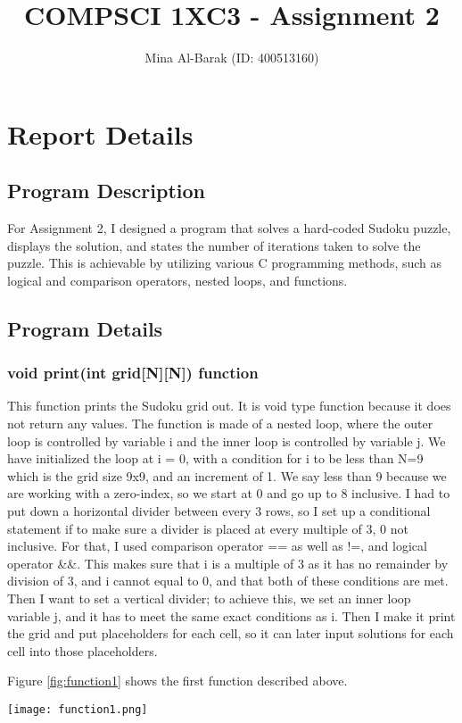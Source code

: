 \documentclass{report}
\title{COMPSCI 1XC3 - Assignment 2}
\author{Mina Al-Barak (ID: 400513160)}
\begin{document}
\maketitle

\chapter{Report Details}
\section{Program Description}
For Assignment 2, I designed a program that solves a hard-coded Sudoku puzzle, displays the solution, and states the number of iterations taken to solve the puzzle. This is achievable by utilizing various C programming methods, such as logical and comparison operators, nested loops, and functions.   

\section{Program Details}

\subsection{void print(int grid[N][N]) function}
This function prints the Sudoku grid out. It is void type function because it does not return any values. The function is made of a nested loop, where the outer loop is controlled by variable i and the inner loop is controlled by variable j. We have initialized the loop at i = 0, with a condition for i to be less than N=9 which is the grid size 9x9, and an increment of 1. We say less than 9 because we are working with a zero-index, so we start at 0 and go up to 8 inclusive. I had to put down a horizontal divider between every 3 rows, so I set up a conditional statement if to make sure a divider is placed at every multiple of 3, 0 not inclusive. For that, I used comparison operator == as well as !=, and logical operator \&\&. This makes sure that i is a multiple of 3 as it has no remainder by division of 3, and i cannot equal to 0, and that both of these conditions are met. Then I want to set a vertical divider; to achieve this, we set an inner loop variable j, and it has to meet the same exact conditions as i. Then I make it print the grid and put placeholders for each cell, so it can later input solutions for each cell into those placeholders.

\centerline{Figure \ref{fig:function1} shows the first function described above.}
  \begin{center}
  \texttt{[image: function1.png]}
  \label{fig:function1}
  \end{center}
  
\end{document}
